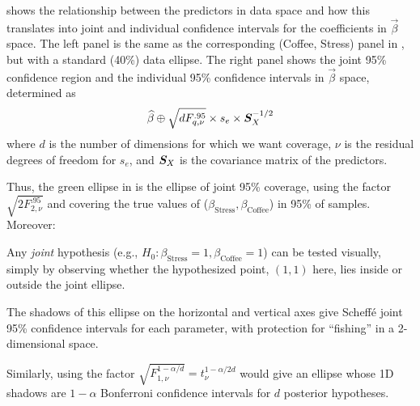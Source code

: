 %

 shows the relationship between the
predictors in data space and how this translates into joint and
individual confidence intervals for the coefficients in
$\vec{\beta}$ space.  The left panel is the same as the corresponding
(Coffee, Stress) panel in , but with
a standard (40\%) data ellipse. The right panel shows the joint 95\% confidence
region and the individual 95\% confidence intervals in $\vec{\beta}$ space, determined as
\begin{equation*}
 \widehat{\beta} \oplus \sqrt{d F^{.95}_{q, \nu}} \times s_e \times \bm{S}_X^{-1/2}
\end{equation*}
where $d$ is the number of dimensions for which we want coverage,
$\nu$ is the residual degrees of freedom for $s_e$, and $\bm{S}_X$
is the covariance matrix of the predictors.

Thus, the green ellipse in  is the
ellipse of joint 95\% coverage, using the factor $\sqrt{2 F^{.95}_{2, \nu}}$
and covering the true values of ($\beta_{\mathrm{Stress}}, \beta_{\mathrm{Coffee}}$)
in 95\% of samples.  Moreover:
\begin{itemize*}
  \item Any \emph{joint} hypothesis (e.g., $H_0:\beta_{\mathrm{Stress}}=1, \beta_{\mathrm{Coffee}}=1$)
can be tested visually, simply by observing whether the
hypothesized point, $(1, 1)$ here, lies inside or outside the joint ellipse.
  \item The shadows of this ellipse on the horizontal and vertical axes
give Scheff\'e joint 95\%  confidence intervals for each parameter, with protection for ``fishing''
in a 2-dimensional space.
  \item Similarly, using the factor
$\sqrt{F^{1-\alpha/d}_{1, \nu}} = t^{1-\alpha/2d}_\nu$ would give an
ellipse whose 1D shadows are $1-\alpha$ Bonferroni confidence intervals
for $d$ posterior hypotheses.
\end{itemize*}

